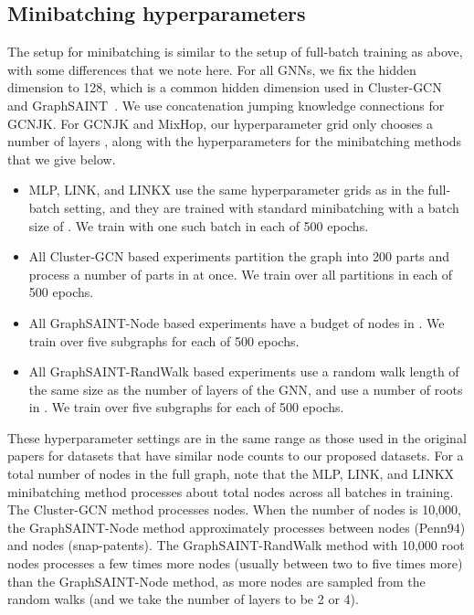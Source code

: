 \documentclass{article}
\begin{document}
\subsection{Minibatching hyperparameters}

The setup for minibatching is similar to the setup of full-batch training as above, with some differences that we note here. For all GNNs, we fix the hidden dimension to 128, which is a common hidden dimension used in Cluster-GCN~\cite{chiang2019cluster} and GraphSAINT~\cite{zeng2019graphsaint}. We use concatenation jumping knowledge connections \cite{xu2018representation} for GCNJK. For GCNJK and MixHop, our hyperparameter grid only chooses a number of layers , along with the hyperparameters for the minibatching methods that we give below. 

\begin{itemize}
    \item MLP, LINK, and LINKX use the same hyperparameter grids as in the full-batch setting, and they are trained with standard minibatching with a batch size of . We train with one such batch in each of 500 epochs.
    \item All Cluster-GCN based experiments partition the graph into 200 parts and process a number of parts in  at once. We train over all partitions in each of 500 epochs.
    \item All GraphSAINT-Node based experiments have a budget of nodes in . We train over five subgraphs for each of 500 epochs.
    \item All GraphSAINT-RandWalk based experiments use a random walk length of the same size as the number of layers  of the GNN, and use a number of roots in . We train over five subgraphs for each of 500 epochs.
\end{itemize}

These hyperparameter settings are in the same range as those used in the original papers \cite{chiang2019cluster, zeng2019graphsaint} for datasets that have similar node counts to our proposed datasets. For a total number of nodes  in the full graph, note that the MLP, LINK, and LINKX minibatching method processes about  total nodes across all batches in training. The Cluster-GCN method processes  nodes. When the number of nodes is 10,000, the GraphSAINT-Node method approximately processes between  nodes (Penn94) and  nodes (snap-patents). The GraphSAINT-RandWalk method with 10,000 root nodes processes a few times more nodes (usually between two to five times more) than the GraphSAINT-Node method, as more nodes are sampled from the random walks (and we take the number of layers  to be 2 or 4).
\end{document}
